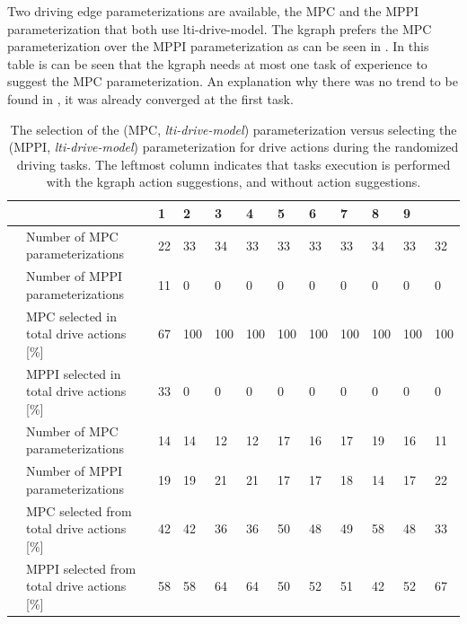 Two driving edge parameterizations are available, the \ac{MPC} and the \ac{MPPI} parameterization that both use lti-drive-model. The \ac{kgraph} prefers the \ac{MPC} parameterization over the \ac{MPPI} parameterization as can be seen in . In this table is can be seen that the \ac{kgraph} needs at most one task of experience to suggest the \ac{MPC} parameterization. An explanation why there was no trend to be found in , it was already converged at the first task.  

\begin{table}[H]
    \centering
    \begin{tabular}%
      {%
        >{\raggedright\arraybackslash}p{}
        >{\raggedright\arraybackslash}p{}
      |p{0.4cm}p{0.4cm}p{0.4cm}p{0.4cm}p{0.4cm}p{0.4cm}p{0.4cm}p{0.4cm}p{0.4cm}p{0.4cm}}
      \multicolumn{2}{c|}{Number of Tasks in experience} &0&1&2&3&4&5&6&7&8&9\\\toprule
      \multirow{4}{0.1\textwidth}{With \ac{kgraph} suggestions} 
      &Number of \ac{MPC} parameterizations&22&33&34&33&33&33&33&34&33&32\\
      &Number of \ac{MPPI} parameterizations&11&0&0&0&0&0&0&0&0&0\\
      & \ac{MPC} selected in total drive actions [\%]&67&100&100&100&100&100&100&100&100&100\\
      & \ac{MPPI} selected in total drive actions [\%]&33&0&0&0&0&0&0&0&0&0\\\midrule
      \multirow{4}{0.1\textwidth}{Without \ac{kgraph} suggestions} 
      &Number of \ac{MPC} parameterizations &14&14&12&12&17&16&17&19&16&11\\
      &Number of \ac{MPPI} parameterizations &19&19&21&21&17&17&18&14&17&22\\
      & \ac{MPC} selected from total drive actions [\%] &42&42&36&36&50&48&49&58&48&33\\
      & \ac{MPPI} selected from total drive actions [\%]&58&58&64&64&50&52&51&42&52&67\\
    \end{tabular}
    \caption{The selection of the (\ac{MPC}, \textit{lti-drive-model}) parameterization versus selecting the (\ac{MPPI}, \textit{lti-drive-model}) parameterization for drive actions during the randomized driving tasks. The leftmost column indicates that tasks execution is performed with the \ac{kgraph} action suggestions, and without action suggestions.}%
    \label{table:rand_drive_mpc_vs_mppi}
\end{table}

